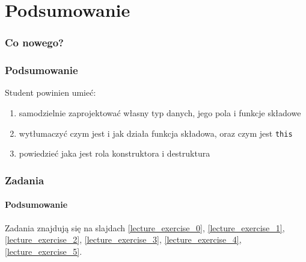\documentclass[aspectratio=169]{beamer}
\begin{document}
\section{Podsumowanie}

\begin{frame}
    \frametitle{Co nowego?}
    \frametitle{Podsumowanie}

    Student powinien umieć:

    \begin{enumerate}
        \item samodzielnie zaprojektować własny typ danych, jego pola i funkcje
            składowe
        \item wytłumaczyć czym jest i jak działa funkcja składowa, oraz czym
            jest {\tt this}
        \item powiedzieć jaka jest rola konstruktora i destruktura
    \end{enumerate}
\end{frame}

\begin{frame}
    \frametitle{Zadania}
    \framesubtitle{Podsumowanie}

    Zadania znajdują się na slajdach
    \ref{lecture_exercise_0},
    \ref{lecture_exercise_1},
    \ref{lecture_exercise_2},
    \ref{lecture_exercise_3},
    \ref{lecture_exercise_4},
    \ref{lecture_exercise_5}.
\end{frame}
\end{document}

